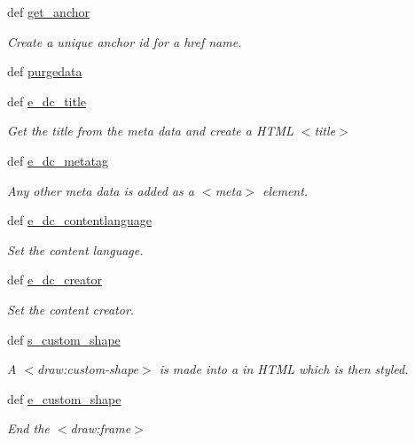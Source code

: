 \begin{DoxyCompactItemize}
def \hyperlink{classodf_1_1odf2xhtml_1_1ODF2XHTML_a463de3b9a7575f414be75a0c570f1620}{get\+\_\+anchor}
\begin{DoxyCompactList}\small\item\em Create a unique anchor id for a href name. \end{DoxyCompactList}\item 
def \hyperlink{classodf_1_1odf2xhtml_1_1ODF2XHTML_a351b7e1b5b75f469f52a9bc054b4c0b7}{purgedata}
\item 
def \hyperlink{classodf_1_1odf2xhtml_1_1ODF2XHTML_ad633ae9a9df78784ff757046626e7f99}{e\+\_\+dc\+\_\+title}
\begin{DoxyCompactList}\small\item\em Get the title from the meta data and create a H\+T\+M\+L $<$title$>$ \end{DoxyCompactList}\item 
def \hyperlink{classodf_1_1odf2xhtml_1_1ODF2XHTML_a6d73151deeb5628e7a9fa83aabb44af7}{e\+\_\+dc\+\_\+metatag}
\begin{DoxyCompactList}\small\item\em Any other meta data is added as a $<$meta$>$ element. \end{DoxyCompactList}\item 
def \hyperlink{classodf_1_1odf2xhtml_1_1ODF2XHTML_ab7bd4bc42e4f4416b2fe93926d62b7ea}{e\+\_\+dc\+\_\+contentlanguage}
\begin{DoxyCompactList}\small\item\em Set the content language. \end{DoxyCompactList}\item 
def \hyperlink{classodf_1_1odf2xhtml_1_1ODF2XHTML_a66b460a739e9f0d892c38d31efcdb08a}{e\+\_\+dc\+\_\+creator}
\begin{DoxyCompactList}\small\item\em Set the content creator. \end{DoxyCompactList}\item 
def \hyperlink{classodf_1_1odf2xhtml_1_1ODF2XHTML_ad4f07d1de9d0b6d4f0802692271d7e54}{s\+\_\+custom\+\_\+shape}
\begin{DoxyCompactList}\small\item\em A $<$draw\+:custom-\/shape$>$ is made into a  in H\+T\+M\+L which is then styled. \end{DoxyCompactList}\item 
def \hyperlink{classodf_1_1odf2xhtml_1_1ODF2XHTML_af15fc249e395d62b54187f7d0295b140}{e\+\_\+custom\+\_\+shape}
\begin{DoxyCompactList}\small\item\em End the $<$draw\+:frame$>$ \end{DoxyCompactList}\item 

\end{DoxyCompactItemize}
